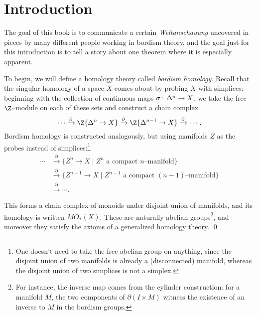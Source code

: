 
\setcounter{chapter}{-1}
\chapter{Introduction}

\label{IntroductionSection}

The goal of this book is to communicate a certain \textit{Weltanschauung} uncovered in pieces by many different people working in bordism theory, and the goal just for this introduction is to tell a story about one theorem where it is especially apparent.

To begin, we will define a homology theory called \textit{bordism homology}.  Recall that the singular homology of a space \(X\) comes about by probing \(X\) with simplices: beginning with the collection of continuous maps \(\sigma\colon\thinspace \Delta^n \to X\), we take the free \(\Z\)--module on each of these sets and construct a chain complex \[\cdots \xrightarrow{\partial} \Z\{\Delta^n \to X\} \xrightarrow{\partial} \Z\{\Delta^{n-1} \to X\} \xrightarrow{\partial} \cdots.\]  Bordism homology is constructed analogously, but using manifolds \(Z\) as the probes instead of simplices:\footnote{One doesn't need to take the free abelian group on anything, since the disjoint union of two manifolds is already a (disconnected) manifold, whereas the disjoint union of two simplices is not a simplex.}
\begin{align*}
\cdots & \xrightarrow{\partial} \{Z^n \to X \mid \text{\(Z^n\) a compact \(n\)--manifold}\} \\
& \xrightarrow{\partial} \{Z^{n-1} \to X \mid \text{\(Z^{n-1}\) a compact \((n-1)\)--manifold}\} \\
& \xrightarrow{\partial} \cdots.
\end{align*}

\begin{lemma}\label{OriginalDefnOfBordism}
This forms a chain complex of monoids under disjoint union of manifolds, and its homology is written \(MO_*(X)\).  These are naturally abelian groups\footnote{For instance, the inverse map comes from the cylinder construction: for a manifold \(M\), the two components of \(\partial(I \times M)\) witness the existence of an inverse to \(M\) in the bordism groups.}, and moreover they satisfy the axioms of a generalized homology theory. \qed
\end{lemma}


